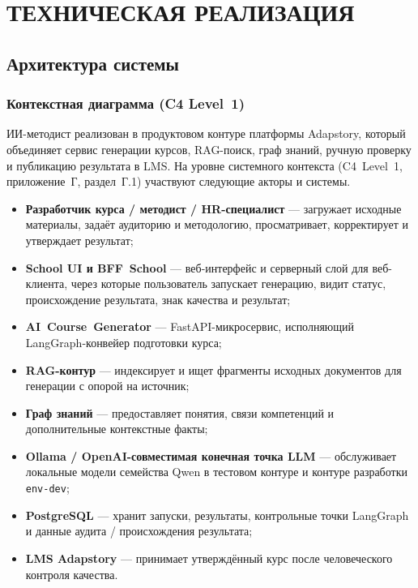 \chapter{ТЕХНИЧЕСКАЯ РЕАЛИЗАЦИЯ}

\section{Архитектура системы}

\subsection{Контекстная диаграмма (C4 Level~1)}

ИИ-методист реализован в продуктовом контуре платформы Adapstory,
который объединяет сервис генерации курсов, RAG-поиск, граф знаний,
ручную проверку и публикацию результата в LMS. На уровне системного
контекста (C4~Level~1, приложение~Г, раздел~Г.1) участвуют следующие
акторы и системы.

\begin{itemize}
  \item \textbf{Разработчик курса / методист / HR-специалист} —
    загружает исходные материалы, задаёт аудиторию и методологию,
    просматривает, корректирует и утверждает результат;
  \item \textbf{School UI и BFF~School} — веб-интерфейс и
    серверный слой для веб-клиента, через которые пользователь запускает
    генерацию, видит статус, происхождение результата, знак качества и результат;
  \item \textbf{AI~Course~Generator} — FastAPI-микросервис,
    исполняющий LangGraph-конвейер подготовки курса;
  \item \textbf{RAG-контур} — индексирует и ищет фрагменты
    исходных документов для генерации с опорой на источник;
  \item \textbf{Граф знаний} — предоставляет понятия, связи
    компетенций и дополнительные контекстные факты;
  \item \textbf{Ollama / OpenAI-совместимая конечная точка LLM} —
    обслуживает локальные модели семейства Qwen в тестовом контуре
    и контуре разработки \texttt{env-dev};
  \item \textbf{PostgreSQL} — хранит запуски, результаты,
    контрольные точки LangGraph и данные аудита / происхождения результата;
  \item \textbf{LMS Adapstory} — принимает утверждённый курс
    после человеческого контроля качества.
\end{itemize}

